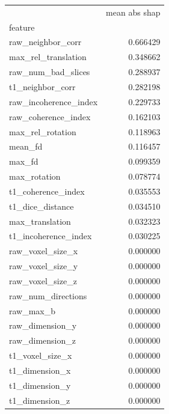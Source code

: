 \documentclass[fleqn,10pt,inline]{wlscirep}
\begin{document}
\begin{appendixbox}
\begin{multicols}{2}
\begin{tabular}{lr|}
\toprule
{} &  mean abs shap \\
feature               &                           \\
\midrule
raw\_neighbor\_corr     &                  0.666429 \\
max\_rel\_translation   &                  0.348662 \\
raw\_num\_bad\_slices    &                  0.288937 \\
t1\_neighbor\_corr      &                  0.282198 \\
raw\_incoherence\_index &                  0.229733 \\
raw\_coherence\_index   &                  0.162103 \\
max\_rel\_rotation      &                  0.118963 \\
mean\_fd               &                  0.116457 \\
max\_fd                &                  0.099359 \\
max\_rotation          &                  0.078774 \\
t1\_coherence\_index    &                  0.035553 \\
t1\_dice\_distance      &                  0.034510 \\
max\_translation       &                  0.032323 \\
t1\_incoherence\_index  &                  0.030225 \\
raw\_voxel\_size\_x      &                  0.000000 \\
raw\_voxel\_size\_y      &                  0.000000 \\
raw\_voxel\_size\_z      &                  0.000000 \\
raw\_num\_directions    &                  0.000000 \\
raw\_max\_b             &                  0.000000 \\
raw\_dimension\_y       &                  0.000000 \\
raw\_dimension\_z       &                  0.000000 \\
t1\_voxel\_size\_x       &                  0.000000 \\
t1\_dimension\_x        &                  0.000000 \\
t1\_dimension\_y        &                  0.000000 \\
t1\_dimension\_z        &                  0.000000 \\

\end{tabular}
\end{multicols}
\end{appendixbox}
\end{document}
